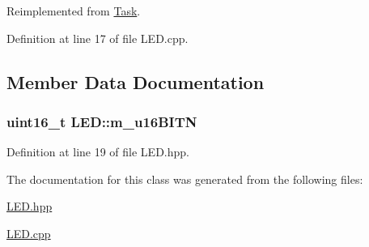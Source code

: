 Reimplemented from \hyperlink{class_task_a923b84dacf9e982daabd09d2476427fa}{Task}.



Definition at line 17 of file L\+E\+D.\+cpp.



\subsection{Member Data Documentation}
\subsubsection[{\texorpdfstring{m\+\_\+u16\+B\+I\+TN}{m_u16BITN}}]{\setlength{\rightskip}{0pt plus 5cm}uint16\+\_\+t L\+E\+D\+::m\+\_\+u16\+B\+I\+TN}\hypertarget{class_l_e_d_abfd7a41e306daedb8aecfe02e35acd95}{}\label{class_l_e_d_abfd7a41e306daedb8aecfe02e35acd95}


Definition at line 19 of file L\+E\+D.\+hpp.



The documentation for this class was generated from the following files\+:\begin{DoxyCompactItemize}
\item 
\hyperlink{_l_e_d_8hpp}{L\+E\+D.\+hpp}\item 
\hyperlink{_l_e_d_8cpp}{L\+E\+D.\+cpp}\end{DoxyCompactItemize}
